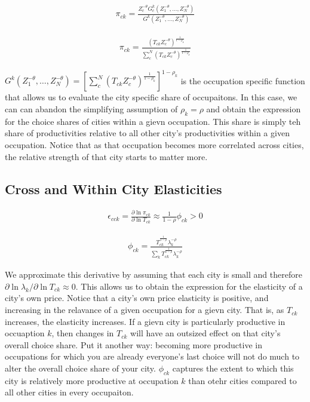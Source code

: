 \documentclass[10pt]{article}
\begin{document}
\begin{align}
    \pi_{ck} = \frac{Z_c^{- \theta} G_c^k(Z_1^{- \theta}, \dots, Z_N^{- \theta})}{G^k(Z_1^{- \theta}, \dots, Z_N^{- \theta})}
\end{align}

\begin{align}
    \pi_{ck} = \frac{(T_{ck} Z_c^{-\theta})^{\frac{1}{1 - \rho_k}}}{\sum_{c}^{N} (T_{ck} Z_c^{-\theta})^{\frac{1}{1 - \rho_k}}}
\end{align}

$G^k (Z_1^{-\theta}, \dots, Z_N^{-\theta}) = [\sum_{c}^{N} (T_{ck} Z_c^{-\theta})^{\frac{1}{1 - \rho_k}}]^{1 - \rho_k}$ is the occupation specific function that allows us to evaluate the city specific share of occupaitons. In this case, we can can abandon the simplifying assumption of $\rho_k = \rho$ and obtain the expression for the choice shares of cities within a gievn occupation. This share is simply teh share of productivities relative to all other city's productivities within a given occupation. Notice that as that occupation becomes more correlated across cities, the relative strength of that city starts to matter more.

\subsection{Cross and Within City Elasticities}

\begin{align}
    \epsilon_{cck} = \frac{\partial \ln \pi_{ck}}{\partial \ln T_{ck}} \approx \frac{1}{1 - \rho} \phi_{ck} > 0
\end{align}

\begin{align}
    \phi_{ck} = \frac{T_{ck}^{\frac{1}{1 - \rho}} \lambda_k^{- \rho}}{\sum_{k}^{} T_{ck}^{\frac{1}{1 - \rho}} \lambda_k^{- \rho}}
\end{align}

We approximate this derivative by assuming that each city is small and therefore $\partial \ln \lambda_k / \partial \ln T_{ck} \approx 0$. This allows us to obtain the expression for the elasticity of a city's own price. Notice that a city's own price elasticity is positive, and increasing in the relavance of a given occupation for a gievn city. That is, as $T_{ck}$ increases, the elasticity increases. If a gievn city is particularly productive in occuaption $k$, then changes in $T_{ck}$ will have an outsized effect on that city's overall choice share. Put it another way: becoming more productive in occupations for which you are already everyone's last choice will not do much to alter the overall choice share of your city. $\phi_{ck}$ captures the extent to which this city is relatively more productive at occupation $k$ than otehr cities compared to all other cities in every occupaiton.
\end{document}
